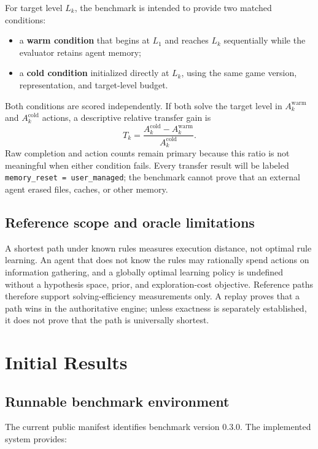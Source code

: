 \documentclass[a4paper,11pt]{article}
\begin{document}
For target level \(L_k\), the benchmark is intended to provide two matched
conditions:

\begin{itemize}[leftmargin=*]
  \item a \textbf{warm condition} that begins at \(L_1\) and reaches \(L_k\)
        sequentially while the evaluator retains agent memory;
  \item a \textbf{cold condition} initialized directly at \(L_k\), using the
        same game version, representation, and target-level budget.
\end{itemize}

Both conditions are scored independently. If both solve the target level in
\(A_k^{\mathrm{warm}}\) and \(A_k^{\mathrm{cold}}\) actions, a descriptive
relative transfer gain is
\[
  T_k =
  \frac{A_k^{\mathrm{cold}}-A_k^{\mathrm{warm}}}
       {A_k^{\mathrm{cold}}}.
\]
Raw completion and action counts remain primary because this ratio is not
meaningful when either condition fails. Every transfer result will be labeled
\texttt{memory\_reset = user\_managed}; the benchmark cannot prove that an
external agent erased files, caches, or other memory.

\subsection{Reference scope and oracle limitations}

A shortest path under known rules measures execution distance, not optimal rule
learning. An agent that does not know the rules may rationally spend actions on
information gathering, and a globally optimal learning policy is undefined
without a hypothesis space, prior, and exploration-cost objective. Reference
paths therefore support solving-efficiency measurements only. A replay proves
that a path wins in the authoritative engine; unless exactness is separately
established, it does not prove that the path is universally shortest.

\section{Initial Results}

\subsection{Runnable benchmark environment}

The current public manifest identifies benchmark version 0.3.0. The implemented
system provides:
\end{document}
